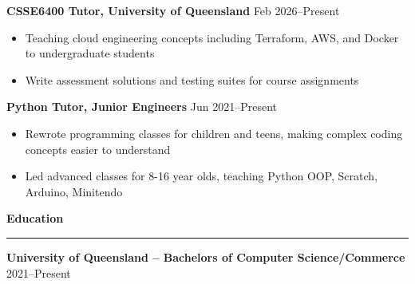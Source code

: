 \documentclass[9pt,a4paper]{extarticle}
\renewcommand{\section}[1]{%
	\vspace{2pt}%
	{\large\bfseries #1}\par\nobreak\vspace{-0.7em}%
	\rule{\linewidth}{0.4pt}\par\nobreak%
	\vspace{-2pt}%
}
\newenvironment{tightlist}{%
	\vspace{-3pt}%
	\begin{itemize}%
		\setlength{\leftmargin}{0pt}%
		\setlength{\itemindent}{0pt}%
		\setlength{\itemsep}{-2pt}%
		\setlength{\parsep}{0pt}%
		\setlength{\topsep}{0pt}%
		\setlength{\partopsep}{0pt}%
	}{%
	\end{itemize}%
	\vspace{-6pt}%
}
\begin{document}
	\textbf{CSSE6400 Tutor, University of Queensland} \hfill Feb 2026--Present
	\begin{tightlist}
		\item Teaching cloud engineering concepts including Terraform, AWS, and Docker to undergraduate students
		\item Write assessment solutions and testing suites for course assignments
	\end{tightlist}
	\textbf{Python Tutor, Junior Engineers} \hfill Jun 2021--Present
	\begin{tightlist}
		\item Rewrote programming classes for children and teens, making complex coding concepts easier to understand
		\item Led advanced classes for 8-16 year olds, teaching Python OOP, Scratch, Arduino, Minitendo
	\end{tightlist}
	\section{Education}
	\textbf{University of Queensland -- Bachelors of Computer Science/Commerce} \hfill 2021--Present
	\par\vspace{1pt}
\end{document}
